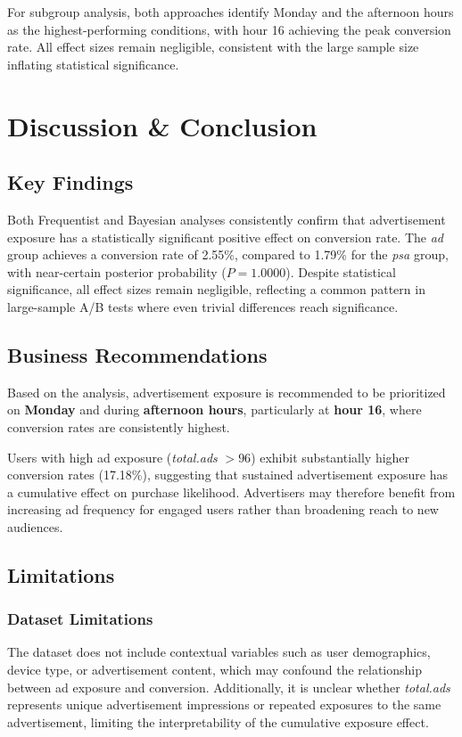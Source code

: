 \documentclass[12pt]{article}
\begin{document}
For subgroup analysis, both approaches identify Monday and the afternoon hours 
as the highest-performing conditions, with hour 16 achieving the peak conversion 
rate. All effect sizes remain negligible, consistent with the large sample size 
inflating statistical significance.

\section{Discussion \& Conclusion}

\subsection{Key Findings}

Both Frequentist and Bayesian analyses consistently confirm that advertisement 
exposure has a statistically significant positive effect on conversion rate. The 
\textit{ad} group achieves a conversion rate of 2.55\%, compared to 1.79\% for 
the \textit{psa} group, with near-certain posterior probability ($P = 1.0000$). 
Despite statistical significance, all effect sizes remain negligible, reflecting 
a common pattern in large-sample A/B tests where even trivial differences reach 
significance.

\subsection{Business Recommendations}

Based on the analysis, advertisement exposure is recommended to be prioritized 
on \textbf{Monday} and during \textbf{afternoon hours}, particularly at 
\textbf{hour 16}, where conversion rates are consistently highest.

Users with high ad exposure (\textit{total.ads} $> 96$) exhibit substantially 
higher conversion rates (17.18\%), suggesting that sustained advertisement 
exposure has a cumulative effect on purchase likelihood. Advertisers may therefore 
benefit from increasing ad frequency for engaged users rather than broadening 
reach to new audiences.

\subsection{Limitations}

\subsubsection*{Dataset Limitations}
The dataset does not include contextual variables such as user demographics, 
device type, or advertisement content, which may confound the relationship between 
ad exposure and conversion. Additionally, it is unclear whether \textit{total.ads} 
represents unique advertisement impressions or repeated exposures to the same 
advertisement, limiting the interpretability of the cumulative exposure effect.
\end{document}
